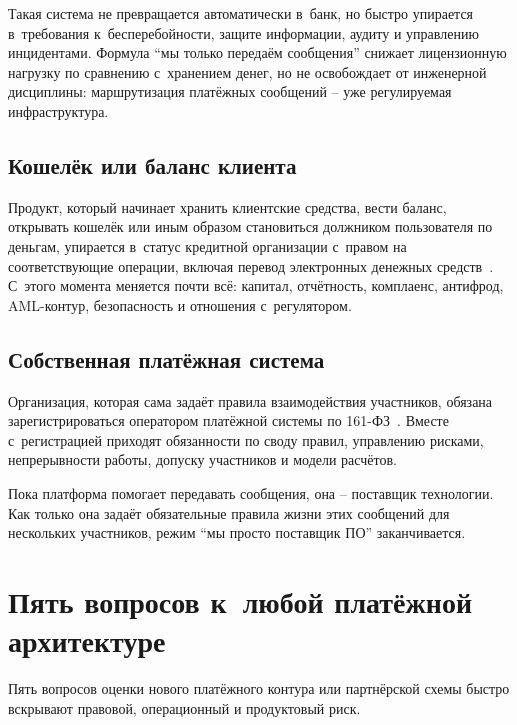 Такая система не превращается автоматически в~банк, но быстро упирается в~требования к~бесперебойности, защите информации, аудиту и управлению инцидентами. Формула \enquote{мы только передаём сообщения} снижает лицензионную нагрузку по сравнению с~хранением денег, но не освобождает от инженерной дисциплины: маршрутизация платёжных сообщений -- уже регулируемая инфраструктура.

\subsection*{Кошелёк или баланс клиента}

Продукт, который начинает хранить клиентские средства, вести баланс, открывать кошелёк или иным образом становиться должником пользователя по деньгам, упирается в~статус кредитной организации с~правом на соответствующие операции, включая перевод электронных денежных средств~\cite{fz-161,fz-395-1}.
С~этого момента меняется почти всё: капитал, отчётность, комплаенс, антифрод, AML-контур, безопасность и отношения с~регулятором.

\subsection*{Собственная платёжная система}

Организация, которая сама задаёт правила взаимодействия участников, обязана зарегистрироваться оператором платёжной системы по 161-ФЗ~\cite{fz-161}. Вместе с~регистрацией приходят обязанности по своду правил, управлению рисками, непрерывности работы, допуску участников и модели расчётов.

Пока платформа помогает передавать сообщения, она -- поставщик технологии. Как только она задаёт обязательные правила жизни этих сообщений для нескольких участников, режим \enquote{мы просто поставщик ПО} заканчивается.

\section{Пять вопросов к~любой платёжной архитектуре}\label{sec:regulation-checklist}

Пять вопросов оценки нового платёжного контура или партнёрской схемы быстро вскрывают правовой, операционный и продуктовый риск.


